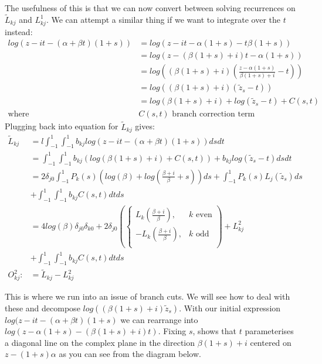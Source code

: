\documentclass{article}
\begin{document}
The usefulness of this is that we can now convert between solving recurrences on $\tilde L_{kj}$ and $L_{kj}^1$.
We can attempt a similar thing if we want to integrate over the $t$ instead:
\begin{align}
    log(z-it-(\alpha+\beta t)(1+s))&=log(z-it-\alpha(1+s)-t\beta(1+s))\\
    &=log(z-(\beta(1+s)+i)t-\alpha(1+s))\\
    &=log((\beta(1+s)+i)(\frac{z-\alpha(1+s)}{\beta(1+s)+i}-t))\\
    &=log((\beta(1+s)+i)(\tilde{z}_s-t))\\
    &=log(\beta(1+s)+i)+log(\tilde{z}_s-t)+C(s,t)\\
    \text{where }&C(s,t)\text{ branch correction term}
\end{align}
Plugging back into equation for $\tilde L_{kj}$ gives:
\begin{align}
    \tilde L_{kj}&=l\int_{-1}^1\int_{-1}^1b_{kj}log(z-it-(\alpha+\beta t)(1+s))dsdt\\
    &=\int_{-1}^1\int_{-1}^1b_{kj}(log(\beta(1+s)+i)+C(s,t))+b_{kj}log(\tilde{z}_s-t)dsdt\\
    &=2\delta_{j0}\int_{-1}^1P_k(s)(log(\beta)+log(\frac{\beta+i}{\beta}+s))ds+\int_{-1}^1P_k(s)L_j(\tilde z_s)ds\\
    &+\int_{-1}^1\int_{-1}^1b_{kj}C(s,t)dtds\\
    &=4log(\beta)\delta_{j0}\delta_{k0}+2\delta_{j0}(\begin{cases}
	L_k(\frac{\beta+i}{\beta}),&k\text{ even}\\
	-L_k(\frac{\beta+i}{\beta}),&k\text{ odd}\\
    \end{cases}) + L_{kj}^2\\
    &+\int_{-1}^1\int_{-1}^1b_{kj}C(s,t)dtds\\
    O_{kj}^2:&=\tilde L_{kj}-L_{kj}^2
\end{align}

This is where we run into an issue of branch cuts.
We will see how to deal with these and decompose $log((\beta(1+s)+i)\tilde{z}_s)$.
With our initial expression $log(z-it-(\alpha+\beta t)(1+s)$ we can rearrange into $log(z-\alpha(1+s)-(\beta (1+s)+i)t)$.
Fixing $s$, shows that $t$ parameterises a diagonal line on the complex plane in the direction $\beta(1+s)+i$ centered on $z-(1+s)\alpha$ as you can see from the diagram below.
\end{document}
